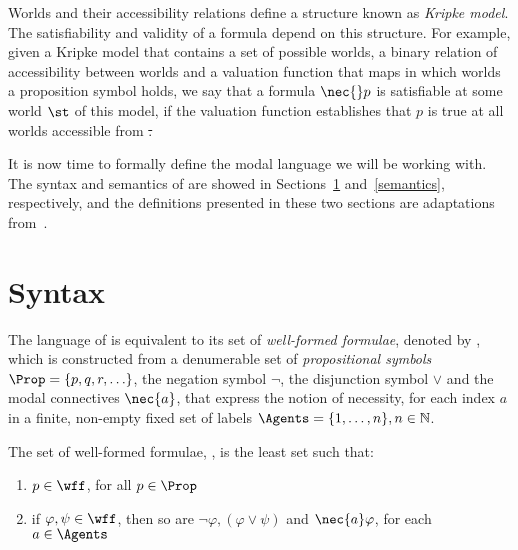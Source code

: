 Worlds and their accessibility relations define a structure known as
\emph{Kripke model}. The satisfiability and validity of a formula depend on this
structure. For example, given a Kripke model that contains a set of possible
worlds, a binary relation of accessibility between worlds and a valuation
function that maps in which worlds a proposition symbol holds, we say that a
formula $\nec{}p$ is satisfiable at some world $\st$ of this model, if the
valuation function establishes that $p$ is true at all worlds accessible from
\st.

It is now time to formally define the modal language we will be working with. The
syntax and semantics of  are showed in Sections~\ref{syntax}
and~\ref{semantics}, respectively, and the definitions presented in these two
sections are adaptations from~\cite{journals/jal/NalonD07}.

\section{Syntax}
\label{syntax}

The language of  is equivalent to its set of \emph{well-formed
formulae}, denoted by \wff, which is constructed from a denumerable set of
\emph{propositional symbols} $\Prop = \{p, q, r, \ldots\}$, the negation
symbol $\neg$, the disjunction symbol $\lor$ and the modal connectives
$\nec{a}$, that express the notion of necessity, for each index $a$
in a finite, non-empty fixed set of labels $\Agents = \{1, \ldots, n\}, n
\in \mathbb{N}$.

\begin{definition}
\label{def:wff}
    The set of well-formed formulae, \wff, is the least set such that:
    \begin{enumerate}
        \item $p \in \wff$, for all $p \in \Prop$
            \vspace{.2ex}
        \item if $\varphi, \psi \in \wff$, then so are $\neg \varphi, (\varphi
            \lor \psi)$ and $\nec{a} \varphi$, for each $a \in \Agents$
    \end{enumerate}
\end{definition}


